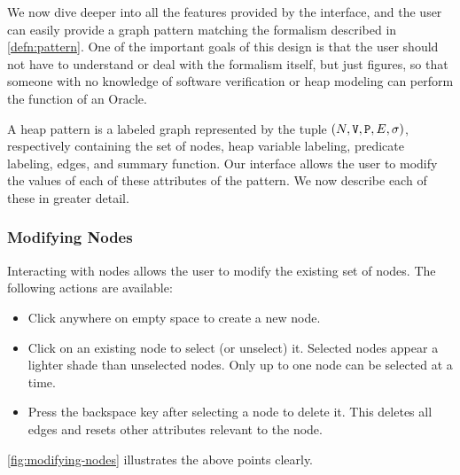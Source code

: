 We now dive deeper into all the features provided by the interface, and the user can easily provide a graph pattern matching the formalism described in \autoref{defn:pattern}. One of the important goals of this design is that the user should not have to understand or deal with the formalism itself, but just figures, so that someone with no knowledge of software verification or heap modeling can perform the function of an Oracle.

A heap pattern is a labeled graph represented by the tuple $(N, \mathtt{V}, \mathtt{P}, E, \sigma)$, respectively containing the set of nodes, heap variable labeling, predicate labeling, edges, and summary function. Our interface allows the user to modify the values of each of these attributes of the pattern. We now describe each of these in greater detail.

\subsubsection{Modifying Nodes}
Interacting with nodes allows the user to modify the existing set of nodes. The following actions are available:
\begin{itemize}
  \item Click anywhere on empty space to create a new node.
  \item Click on an existing node to select (or unselect) it. Selected nodes appear a lighter shade than unselected nodes. Only up to one node can be selected at a time.
  \item Press the backspace key after selecting a node to delete it. This deletes all edges and resets other attributes relevant to the node.
\end{itemize}

\autoref{fig:modifying-nodes} illustrates the above points clearly.

